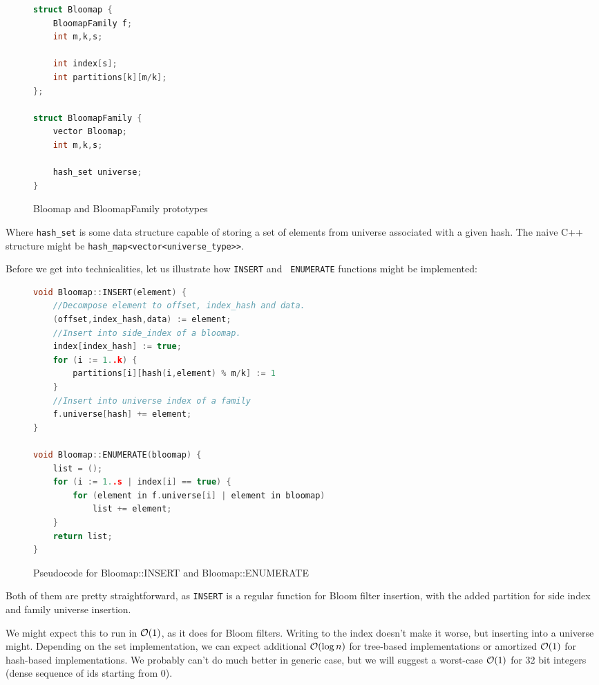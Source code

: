 \begin{figure}[h!]
\begin{tcolorbox}
	\begin{lstlisting}[language=c++,tabsize=2]
struct Bloomap {
    BloomapFamily f;
    int m,k,s;

    int index[s];
    int partitions[k][m/k];
};

struct BloomapFamily {
    vector Bloomap;
    int m,k,s;

    hash_set universe;
}
\end{lstlisting}
\end{tcolorbox}
\caption{Bloomap and BloomapFamily prototypes}
\end{figure}

Where {\tt hash\_set} is some data structure capable of storing a set of
elements from universe associated with a given hash. The naive C++ structure
might be {\tt hash\_map<vector<universe\_type>>}.

Before we get into technicalities, let us illustrate how {\tt INSERT} and {\tt
ENUMERATE} functions might be implemented:

\begin{figure}[h!]
\begin{tcolorbox}
\begin{lstlisting}[language=c++,tabsize=2]
void Bloomap::INSERT(element) {
    //Decompose element to offset, index_hash and data.
    (offset,index_hash,data) := element;
    //Insert into side_index of a bloomap.
    index[index_hash] := true;
    for (i := 1..k) {
        partitions[i][hash(i,element) % m/k] := 1
    }
    //Insert into universe index of a family
    f.universe[hash] += element;
}

void Bloomap::ENUMERATE(bloomap) {
    list = ();
	for (i := 1..s | index[i] == true) {
        for (element in f.universe[i] | element in bloomap) 
            list += element;
    }
    return list;
}
\end{lstlisting}
\end{tcolorbox}
\caption{Pseudocode for Bloomap::INSERT and Bloomap::ENUMERATE}
\end{figure}


Both of them are pretty straightforward, as {\tt INSERT} is a regular function
for Bloom filter insertion, with the added partition for side index and family
universe insertion.

We might expect this to run in $\mathcal{O}(1)$, as it does for Bloom filters. Writing to
the index doesn't make it worse, but inserting into a universe might. Depending
on the set implementation, we can expect additional $\mathcal{O}(\log n)$ for tree-based
implementations or amortized $\mathcal{O}(1)$ for hash-based implementations. We probably
can't do much better in generic case, but we will suggest a worst-case $\mathcal{O}(1)$
for 32 bit integers (dense sequence of ids starting from 0).


